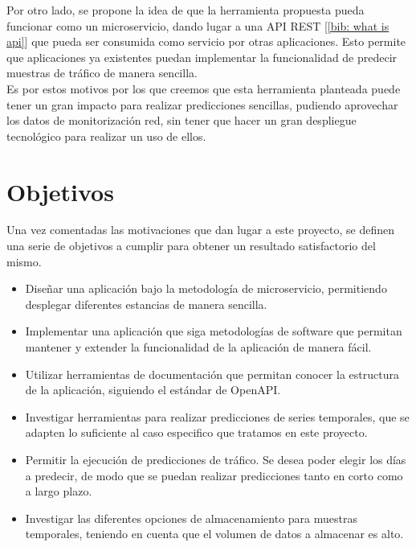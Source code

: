 \documentclass[a4paper, oneside, 12pt]{book}
\begin{document}
	\pagebreak
	
	\noindent Por otro lado, se propone la idea de que la herramienta propuesta pueda funcionar como un microservicio, dando lugar a una API REST [\ref{bib: what is api}] que pueda ser consumida como servicio por otras aplicaciones. Esto permite que aplicaciones ya existentes puedan implementar la funcionalidad de predecir muestras de tráfico de manera sencilla. \\
	
	\noindent Es por estos motivos por los que creemos que esta herramienta planteada puede tener un gran impacto para realizar predicciones sencillas, pudiendo aprovechar los datos de monitorización red, sin tener que hacer un gran despliegue tecnológico para realizar un uso de ellos. \\
	
	\section{Objetivos}
	
	\noindent Una vez comentadas las motivaciones que dan lugar a este proyecto, se definen una serie de objetivos a cumplir para obtener un resultado satisfactorio del mismo.
	
	\begin{itemize}
		\item Diseñar una aplicación bajo la metodología de microservicio, permitiendo desplegar diferentes estancias de manera sencilla.
		
		\item Implementar una aplicación que siga metodologías de software que permitan mantener y extender la funcionalidad de la aplicación de manera fácil.
		
		\item Utilizar herramientas de documentación que permitan conocer la estructura de la aplicación, siguiendo el estándar de OpenAPI.
		
		\item Investigar herramientas para realizar predicciones de series temporales, que se adapten lo suficiente al caso especifico que tratamos en este proyecto.
		
		\item Permitir la ejecución de predicciones de tráfico. Se desea poder elegir los días a predecir, de modo que se puedan realizar predicciones tanto en corto como a largo plazo.
		
		\item Investigar las diferentes opciones de almacenamiento para muestras temporales, teniendo en cuenta que el volumen de datos a almacenar es alto. 
	\end{itemize}
	
\end{document}
